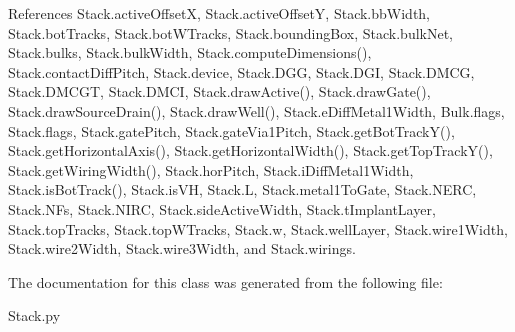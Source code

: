 References Stack.\-active\-Offset\-X, Stack.\-active\-Offset\-Y, Stack.\-bb\-Width, Stack.\-bot\-Tracks, Stack.\-bot\-W\-Tracks, Stack.\-bounding\-Box, Stack.\-bulk\-Net, Stack.\-bulks, Stack.\-bulk\-Width, Stack.\-compute\-Dimensions(), Stack.\-contact\-Diff\-Pitch, Stack.\-device, Stack.\-D\-G\-G, Stack.\-D\-G\-I, Stack.\-D\-M\-C\-G, Stack.\-D\-M\-C\-G\-T, Stack.\-D\-M\-C\-I, Stack.\-draw\-Active(), Stack.\-draw\-Gate(), Stack.\-draw\-Source\-Drain(), Stack.\-draw\-Well(), Stack.\-e\-Diff\-Metal1\-Width, Bulk.\-flags, Stack.\-flags, Stack.\-gate\-Pitch, Stack.\-gate\-Via1\-Pitch, Stack.\-get\-Bot\-Track\-Y(), Stack.\-get\-Horizontal\-Axis(), Stack.\-get\-Horizontal\-Width(), Stack.\-get\-Top\-Track\-Y(), Stack.\-get\-Wiring\-Width(), Stack.\-hor\-Pitch, Stack.\-i\-Diff\-Metal1\-Width, Stack.\-is\-Bot\-Track(), Stack.\-is\-V\-H, Stack.\-L, Stack.\-metal1\-To\-Gate, Stack.\-N\-E\-R\-C, Stack.\-N\-Fs, Stack.\-N\-I\-R\-C, Stack.\-side\-Active\-Width, Stack.\-t\-Implant\-Layer, Stack.\-top\-Tracks, Stack.\-top\-W\-Tracks, Stack.\-w, Stack.\-well\-Layer, Stack.\-wire1\-Width, Stack.\-wire2\-Width, Stack.\-wire3\-Width, and Stack.\-wirings.



The documentation for this class was generated from the following file\-:\begin{DoxyCompactItemize}
\item 
Stack.\-py\end{DoxyCompactItemize}
